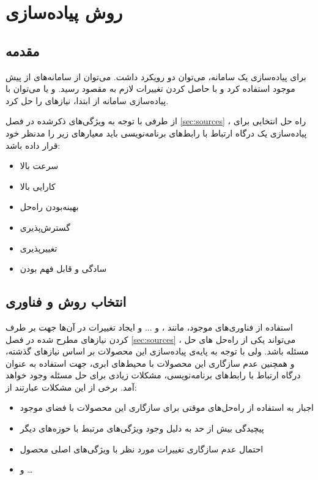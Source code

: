 \section{روش پیاده‌سازی}\label{sec:implementation}

\subsection{مقدمه}\label{subsec:impl_intro}
برای پیاده‌سازی یک سامانه، می‌توان دو رویکرد داشت. می‌توان از سامانه‌های از پیش موجود استفاده کرد و با حاصل کردن تغییرات لازم به مقصود رسید. و یا می‌توان با پیاده‌سازی سامانه از ابتدا، نیاز‌های را حل کرد.

از طرفی با توجه به ویژگی‌های ذکرشده در فصل
\ref{sec:sources}
، راه حل انتخابی برای پیاده‌سازی یک درگاه ارتباط با رابط‌های برنامه‌نویسی باید معیار‌های زیر را مدنظر خود قرار داده باشد:

\begin{itemize}
    \item سرعت بالا
    \item کارایی بالا
    \item بهینه‌بودن راه‌حل
    \item گسترش‌پذیری
    \item تغییر‌پذیری
    \item سادگی و قابل فهم بودن
\end{itemize}

\subsection{انتخاب روش و فناوری}\label{subsec:impl_choose}
استفاده‌ از فناوری‌های موجود، مانند ،  و ... و ایجاد تغییرات در آن‌ها جهت بر طرف کردن نیاز‌های مطرح شده در فصل
\ref{sec:sources}
، می‌تواند یکی از راه‌حل ‌های حل مسئله باشد. ولی با توجه به پایه‌ی پیاده‌سازی این محصولات بر اساس نیاز‌های گذشته، و همچنین عدم سازگاری این محصولات با محیط‌های ابری، جهت استفاده به عنوان درگاه ارتباط با رابط‌های برنامه‌نویسی، مشکلات زیادی برای حل مسئله وجود خواهد آمد. برخی از این مشکلات عبارتند از:

\begin{itemize}
    \item اجبار به استفاده از راه‌حل‌های موقتی برای سازگاری این محصولات با فضای موجود
    \item پیچیدگی بیش از حد به دلیل وجود ویژگی‌های مرتبط با حوزه‌های دیگر
    \item احتمال عدم سازگاری تغییرات مورد نظر با ویژگی‌های اصلی محصول
    \item و \ldots
\end{itemize}

